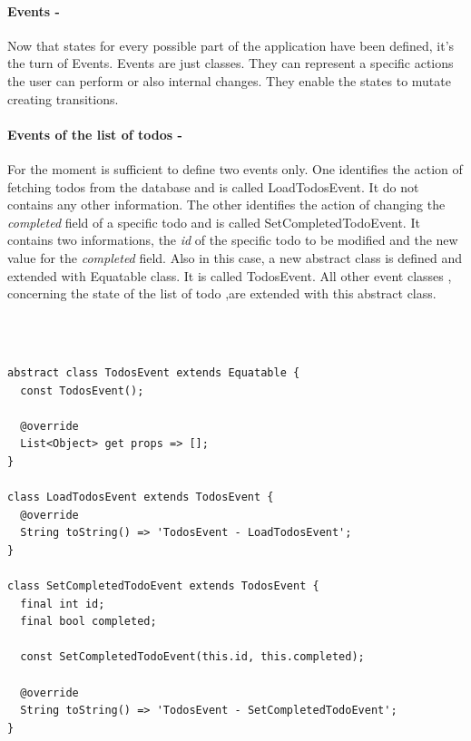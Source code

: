 \paragraph{Events - }
\label{subpar:todo_app_bloc_core_state}

Now that states for every possible part of the application have been defined, it’s the turn of Events. Events are just classes. They can represent a specific actions the user can perform or also internal changes. They enable the states to mutate creating transitions. 


\paragraph{Events of the list of todos - }
\label{subpar:todo_app_bloc_core_state}

For the moment is sufficient to define two events only. One identifies the action of fetching todos from the database and is called LoadTodosEvent. It do not contains any other information. The other identifies the action of changing the \textit{completed} field of a specific todo and is called SetCompletedTodoEvent. It contains two informations, the \textit{id} of the specific todo to be modified and the new value for the \textit{completed }field. 
Also in this case, a new abstract class is defined and extended with Equatable class. It is called TodosEvent. All other event classes , concerning the state of the list of todo ,are extended with this abstract class.
\begin{code}
\mbox{}\\
 \mbox{}
\label{code:2.14}
\begin{verbatim}

abstract class TodosEvent extends Equatable {
  const TodosEvent();

  @override
  List<Object> get props => [];
}

class LoadTodosEvent extends TodosEvent {
  @override
  String toString() => 'TodosEvent - LoadTodosEvent';
}

class SetCompletedTodoEvent extends TodosEvent {
  final int id;
  final bool completed;

  const SetCompletedTodoEvent(this.id, this.completed);

  @override
  String toString() => 'TodosEvent - SetCompletedTodoEvent';
}
\end{verbatim}
\mbox{}
\end{code}


